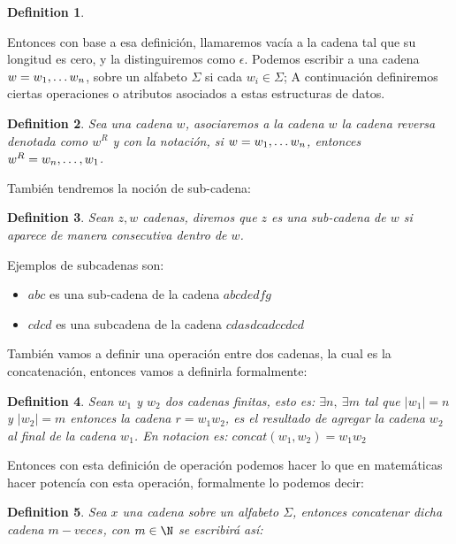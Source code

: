 \documentclass[10pt]{report}
\newtheorem{definition}{Definition}
\begin{document}
{\begin{definition}
    \end{definition}
    Entonces con base a esa definición, llamaremos vacía a la cadena tal que su longitud es cero, y la
    distinguiremos como $\epsilon$.\newline
    Podemos escribir a una cadena $w = w_{1},\mathellipsis w_{n}$, sobre un alfabeto $\Sigma$ si cada $w_{i} \in \Sigma$;
    \space
    A continuación definiremos ciertas operaciones o atributos asociados a estas estructuras de datos.
    \begin{definition}
        Sea una cadena $w$, asociaremos a la cadena $w$ la cadena reversa denotada como $w^R$
        y con la notación, si $w = w_{1},\mathellipsis w_{n}$, entonces $w^{R} = w_{n},\mathellipsis,w_{1}$.
    \end{definition}
    También tendremos la noción de sub-cadena:\newline
    \begin{definition}
        Sean $z,w$ cadenas, diremos que $z$ es una sub-cadena de $w$ si aparece de manera consecutiva dentro de $w$.
    \end{definition}
    Ejemplos de subcadenas son:
    \begin{itemize}
        \item $abc$ es una sub-cadena de la cadena $abcdedfg$
        \item $cdcd$ es una subcadena de la cadena $cdasdcadccdcd$
    \end{itemize}
    También vamos a definir una operación entre dos cadenas, la cual es
    la concatenación, entonces vamos a definirla formalmente:\newline
    \begin{definition}
        Sean $w_{1}$ y $w_{2}$ dos cadenas finitas, esto es:\newline
        $\exists n,\ \exists m$ tal que $|w_{1}|=n$ y $|w_{2}|=m$
        entonces la cadena $r = w_{1}w_{2}$, es el resultado de agregar la cadena $w_{2}$ al final de la cadena
        $w_{1}$.\newline
        En notacion es: $concat(w_{1},w_{2}) = w_{1}w_{2}$
    \end{definition}
    Entonces con esta definición de operación podemos hacer lo que en matemáticas hacer potencía con esta operación,
    formalmente lo podemos decir:\newline
    \begin{definition}
        Sea $x$ una cadena sobre un alfabeto $\Sigma$, entonces concatenar dicha cadena
        $m-veces$, con $m\in\N$ se escribirá así:\newline

\end{definition}}
\end{document}
